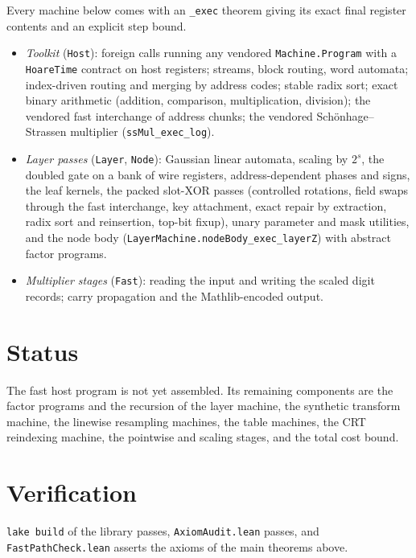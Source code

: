 \documentclass[11pt]{amsart}
\theoremstyle{remark}
\begin{document}
Every machine below comes with an \texttt{\_exec} theorem giving its exact final register
contents and an explicit step bound.

\begin{itemize}
\item \emph{Toolkit} (\texttt{Host}): foreign calls running any vendored \texttt{Machine.Program}
with a \texttt{HoareTime} contract on host registers; streams, block routing, word automata;
index-driven routing and merging by address codes; stable radix sort; exact binary arithmetic
(addition, comparison, multiplication, division); the vendored fast
interchange of address chunks; the vendored Schönhage--Strassen multiplier
(\texttt{ssMul\_exec\_log}).
\item \emph{Layer passes} (\texttt{Layer}, \texttt{Node}): Gaussian linear automata, scaling by
$2^s$, the doubled gate on a bank of wire registers, address-dependent phases and signs, the
leaf kernels, the packed slot-XOR passes (controlled rotations, field swaps through the fast
interchange, key attachment, exact repair by extraction, radix sort and reinsertion, top-bit
fixup), unary parameter and mask utilities, and the node body
(\texttt{LayerMachine.nodeBody\_exec\_layerZ}) with abstract factor programs.
\item \emph{Multiplier stages} (\texttt{Fast}): reading the input and writing the scaled digit
records; carry propagation and the Mathlib-encoded output.
\end{itemize}

\section{Status}

The fast host program is not yet assembled. Its remaining components are the factor programs
and the recursion of the layer machine, the synthetic transform machine, the linewise
resampling machines, the table machines, the CRT reindexing machine, the pointwise and scaling
stages, and the total cost bound.

\section{Verification}

\texttt{lake build} of the library passes, \texttt{AxiomAudit.lean} passes, and
\texttt{FastPathCheck.lean} asserts the axioms of the main theorems above.
\end{document}
